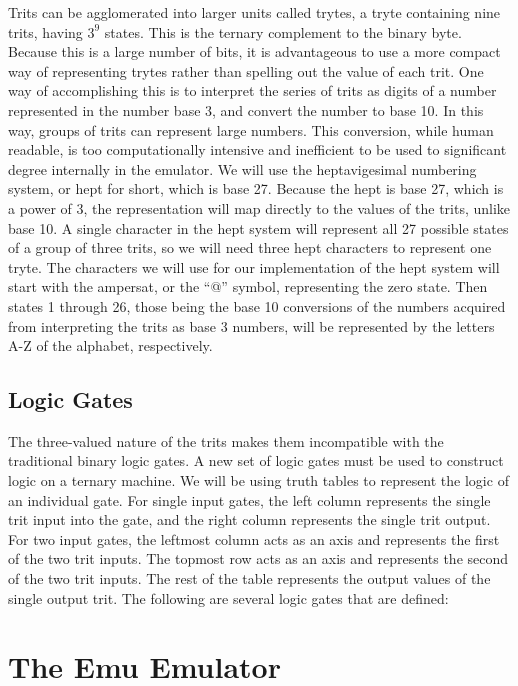 \documentclass[12pt]{article}
\begin{document}
Trits can be agglomerated into larger units called trytes, a tryte containing nine trits,
having $3^{9}$ states. This is the ternary complement to the binary byte. Because this is a
large number of bits, it is advantageous to use a more compact way of representing trytes rather
than spelling out the value of each trit. One way of accomplishing this is to interpret the
series of trits as digits of a number represented in the number base 3, and convert the number
to base 10. In this way, groups of trits can represent large numbers. This conversion, while
human readable, is too computationally intensive and inefficient to be used to significant degree
internally in the emulator. We will use the heptavigesimal numbering system, or hept for short,
which is base 27. Because the hept is base 27, which is a power of 3, the representation will map
directly to the values of the trits, unlike base 10. A single character in the hept system will
represent all 27 possible states of a group of three trits, so we will need three hept characters
to represent one tryte. The characters we will use for our implementation of the hept system will
start with the ampersat, or the “@” symbol, representing the zero state. Then states 1 through 26,
those being the base 10 conversions of the numbers acquired from interpreting the trits as base 3
numbers, will be represented by the letters A-Z of the alphabet, respectively.

\subsection{Logic Gates}

The three-valued nature of the trits makes them incompatible with the traditional binary logic
gates. A new set of logic gates must be used to construct logic on a ternary machine. We will be
using truth tables to represent the logic of an individual gate. For single input gates, the left
column represents the single trit input into the gate, and the right column represents the single
trit output. For two input gates, the leftmost column acts as an axis and represents the first of
the two trit inputs. The topmost row acts as an axis and represents the second of the two trit
inputs. The rest of the table represents the output values of the single output trit. The following
are several logic gates that are defined:



\section{The Emu Emulator} \label{sec:Emu}
\end{document}
